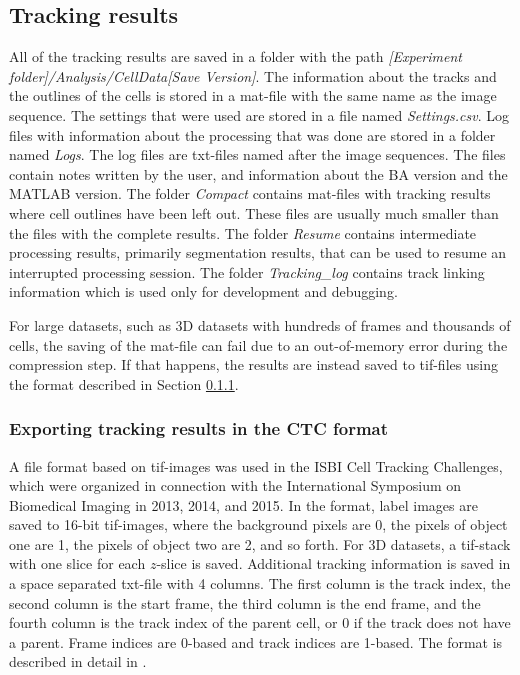 \documentclass[a4paper, oneside, onecolumn, 11pt]{article}
\newcommand{\file}[1]{\emph{#1}}
\begin{document}

\subsection{Tracking results}
\label{sec:tracking-results}
All of the tracking results are saved in a folder with the path \file{[Experiment folder]/\allowbreak Analysis/\allowbreak CellData[Save Version]}. The information about the tracks and the outlines of the cells is stored in a mat-file with the same name as the image sequence. The settings that were used are stored in a file named \file{Settings.csv}. Log files with information about the processing that was done are stored in a folder named \file{Logs}. The log files are txt-files named after the image sequences. The files contain notes written by the user, and information about the BA version and the MATLAB version. The folder \file{Compact} contains mat-files with tracking results where cell outlines have been left out. These files are usually much smaller than the files with the complete results. The folder \file{Resume} contains intermediate processing results, primarily segmentation results, that can be used to resume an interrupted processing session. The folder \file{Tracking\_log} contains track linking information which is used only for development and debugging.

For large datasets, such as 3D datasets with hundreds of frames and thousands of cells, the saving of the mat-file can fail due to an out-of-memory error during the compression step. If that happens, the results are instead saved to tif-files using the format described in Section \ref{sec:CTC-format}.

\subsubsection{Exporting tracking results in the CTC format}
\label{sec:CTC-format}
A file format based on tif-images was used in the ISBI Cell Tracking Challenges, which were organized in connection with the International Symposium on Biomedical Imaging in 2013, 2014, and 2015. In the format, label images are saved to 16-bit tif-images, where the background pixels are 0, the pixels of object one are 1, the pixels of object two are 2, and so forth. For 3D datasets, a tif-stack with one slice for each $z$-slice is saved. Additional tracking information is saved in a space separated txt-file with 4 columns. The first column is the track index, the second column is the start frame, the third column is the end frame, and the fourth column is the track index of the parent cell, or 0 if the track does not have a parent. Frame indices are 0-based and track indices are 1-based. The format is described in detail in \cite{Maska14Benchmark, Ortiz15Challenge, Ulman17Objective}.
\end{document}
